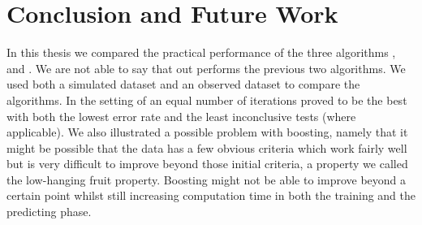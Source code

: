 
 
\chapter{Conclusion and Future Work} 
\label{sec:Concl}

In this thesis we compared the practical performance of the three algorithms \adaB, \NHB and \squintB. We are not able to say that \squintB out performs the previous two algorithms. We used both a simulated dataset and an observed dataset to compare the algorithms. In the setting of an equal number of iterations \NHB proved to be the best with both the lowest error rate and the least inconclusive tests (where applicable). We also illustrated a possible problem with boosting, namely that it might be possible that the data has a few obvious criteria which work fairly well but is very difficult to improve beyond those initial criteria, a property we called the low-hanging fruit property. Boosting might not be able to improve beyond a certain point whilst still increasing computation time in both the training and the predicting phase. 

